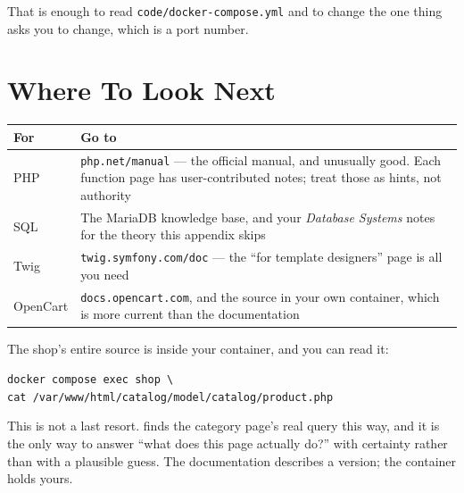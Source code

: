That is enough to read \texttt{code/docker-compose.yml} and to change the one
thing  asks you to change, which is a port number.

\section{Where To Look Next}

\begin{longtable}{@{}L{3.2cm}L{11.8cm}@{}}
\toprule
{}
\textbf{For} & \textbf{Go to} \\
\midrule
\endhead
PHP & \texttt{php.net/manual} --- the official manual, and unusually good. Each
function page has user-contributed notes; treat those as hints, not authority \\
SQL & The MariaDB knowledge base, and your \emph{Database Systems} notes for
the theory this appendix skips \\
Twig & \texttt{twig.symfony.com/doc} --- the ``for template designers'' page is
all you need \\
OpenCart & \texttt{docs.opencart.com}, and the source in your own container,
which is more current than the documentation \\
\bottomrule
\end{longtable}

\begin{conceptbox}
The shop's entire source is inside your container, and you can read it:

\smallskip
\texttt{docker compose exec shop \textbackslash}\\
\texttt{\phantom{xx}cat /var/www/html/catalog/model/catalog/product.php}

\smallskip
This is not a last resort.  finds the category page's real
query this way, and it is the only way to answer ``what does this page actually
do?'' with certainty rather than with a plausible guess. The documentation
describes a version; the container holds yours.
\end{conceptbox}
